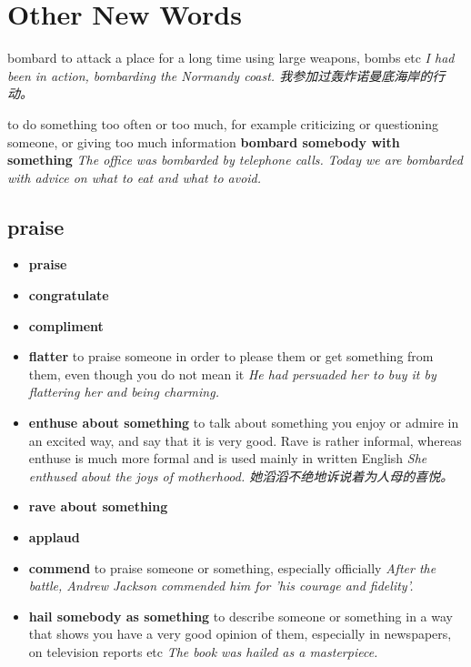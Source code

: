 \chapter{Other New Words}

\begin{DefWord}{bombard}
    to attack a place for a long time using large weapons, bombs etc
    \textit{I had been in action, bombarding the Normandy coast. 我参加过轰炸诺曼底海岸的行动。}

    to do something too often or too much, for example criticizing or questioning someone, or giving too much information
    \textbf{bombard somebody with something}
    \textit{The office was bombarded by telephone calls.}
    \textit{Today we are bombarded with advice on what to eat and what to avoid.}

\end{DefWord}

\section{praise}

\begin{itemize}
    \item \textbf{praise}
    \item \textbf{congratulate}
    \item \textbf{compliment}
    \item \textbf{flatter} to praise someone in order to please them or get something from them, even though you do not mean it
    \textit{He had persuaded her to buy it by flattering her and being charming.}
    \item \textbf{enthuse about something} to talk about something you enjoy or admire in an excited way, and say that it is very good. Rave is rather informal, whereas enthuse is much more formal and is used mainly in written English \textit{She enthused about the joys of motherhood. 她滔滔不绝地诉说着为人母的喜悦。}
    \item \textbf{rave about something}
    \item \textbf{applaud}
    \item \textbf{commend} to praise someone or something, especially officially \textit{After the battle, Andrew Jackson commended him for 'his courage and fidelity'.}
    \item \textbf{hail somebody as something} to describe someone or something in a way that shows you have a very good opinion of them, especially in newspapers, on television reports etc \textit{The book was hailed as a masterpiece.}
\end{itemize}